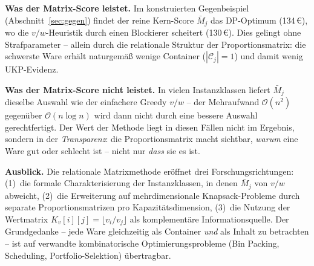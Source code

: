 \documentclass[a4paper,11pt]{article}
\begin{document}
\medskip
\noindent
\textbf{Was der Matrix-Score leistet.}
Im konstruierten Gegenbeispiel (Abschnitt~\ref{sec:gegen})
findet der reine Kern-Score $\bar{M}_j$ das DP-Optimum (134\,\euro),
wo die $v/w$-Heuristik durch einen Blockierer scheitert (130\,\euro).
Dies gelingt ohne Strafparameter -- allein durch die relationale
Struktur der Proportionsmatrix: die schwerste Ware erhält
naturgemäß wenige Container ($|\mathcal{C}_j| = 1$) und damit
wenig UKP-Evidenz.

\medskip
\noindent
\textbf{Was der Matrix-Score nicht leistet.}
In vielen Instanzklassen liefert $\bar{M}_j$ dieselbe Auswahl
wie der einfachere Greedy $v/w$ -- der Mehraufwand $\mathcal{O}(n^2)$
gegenüber $\mathcal{O}(n \log n)$ wird dann nicht durch eine
bessere Auswahl gerechtfertigt. Der Wert der Methode liegt in
diesen Fällen nicht im Ergebnis, sondern in der
\emph{Transparenz}: die Proportionsmatrix macht sichtbar,
\emph{warum} eine Ware gut oder schlecht ist -- nicht nur
\emph{dass} sie es ist.

\medskip
\noindent
\textbf{Ausblick.}
Die relationale Matrixmethode eröffnet drei Forschungsrichtungen:
(1)~die formale Charakterisierung der Instanzklassen, in denen
$\bar{M}_j$ von $v/w$ abweicht,
(2)~die Erweiterung auf mehrdimensionale Knapsack-Probleme durch
separate Proportionsmatrizen pro Kapazitätsdimension,
(3)~die Nutzung der Wertmatrix $K_v[i][j] = \lfloor v_i/v_j \rfloor$
als komplementäre Informationsquelle.
Der Grundgedanke -- jede Ware gleichzeitig als Container
\emph{und} als Inhalt zu betrachten -- ist auf verwandte
kombinatorische Optimierungsprobleme (Bin Packing,
Scheduling, Portfolio-Selektion) übertragbar.



\end{document}
